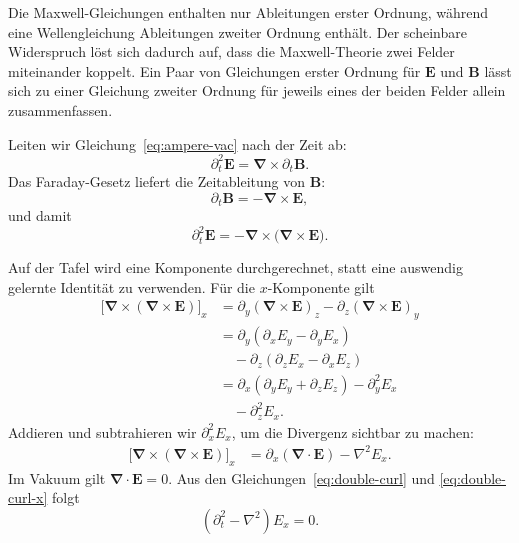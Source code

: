 Die Maxwell-Gleichungen enthalten nur Ableitungen erster Ordnung, während eine Wellengleichung Ableitungen zweiter Ordnung enthält. Der scheinbare Widerspruch löst sich dadurch auf, dass die Maxwell-Theorie zwei Felder miteinander koppelt. Ein Paar von Gleichungen erster Ordnung für \(\mathbf E\) und \(\mathbf B\) lässt sich zu einer Gleichung zweiter Ordnung für jeweils eines der beiden Felder allein zusammenfassen.

Leiten wir Gleichung~\eqref{eq:ampere-vac} nach der Zeit ab:
\begin{equation}
\partial_t^2\mathbf E
=\boldsymbol\nabla\times\partial_t\mathbf B.
\end{equation}
Das Faraday-Gesetz liefert die Zeitableitung von \(\mathbf B\):
\begin{equation}
\partial_t\mathbf B=-\boldsymbol\nabla\times\mathbf E,
\end{equation}
und damit
\begin{equation}
\partial_t^2\mathbf E
=-\boldsymbol\nabla\times
  \bigl(\boldsymbol\nabla\times\mathbf E\bigr).
\label{eq:double-curl}
\end{equation}

Auf der Tafel wird eine Komponente durchgerechnet, statt eine auswendig gelernte Identität zu verwenden. Für die \(x\)-Komponente gilt
\begin{align}
\bigl[\boldsymbol\nabla\times
(\boldsymbol\nabla\times\mathbf E)\bigr]_x
&=\partial_y(\boldsymbol\nabla\times\mathbf E)_z
 -\partial_z(\boldsymbol\nabla\times\mathbf E)_y\\
&=\partial_y(\partial_xE_y-\partial_yE_x)\\
&\quad-\partial_z(\partial_zE_x-\partial_xE_z)\\
&=\partial_x(\partial_yE_y+\partial_zE_z)
 -\partial_y^2E_x\\
&\quad-\partial_z^2E_x.
\end{align}
Addieren und subtrahieren wir \(\partial_x^2E_x\), um die Divergenz sichtbar zu machen:
\begin{align}
\bigl[\boldsymbol\nabla\times
(\boldsymbol\nabla\times\mathbf E)\bigr]_x
&=\partial_x(\boldsymbol\nabla\cdot\mathbf E)
 -\nabla^2E_x.
\label{eq:double-curl-x}
\end{align}
Im Vakuum gilt \(\boldsymbol\nabla\cdot\mathbf E=0\). Aus den Gleichungen~\eqref{eq:double-curl} und \eqref{eq:double-curl-x} folgt
\begin{equation}
\left(\partial_t^2-\nabla^2\right)E_x=0.
\label{eq:ex-wave}
\end{equation}


